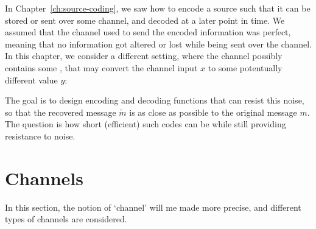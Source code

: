 In Chapter~\ref{ch:source-coding}, we saw how to encode a source such that it can be stored or sent over some channel, and decoded at a later point in time. We assumed that the channel used to send the encoded information was perfect, meaning that no information got altered or lost while being sent over the channel. In this chapter, we consider a different setting, where the channel possibly contains some , that may convert the channel input $x$ to some potentually different value $y$:

\begin{figure}[h]
\begin{center}
\end{center}
\end{figure}
The goal is to design encoding and decoding functions that can resist this noise, so that the recovered message $\tilde{m}$ is as close as possible to the original message $m$. The question is how short (efficient) such codes can be while still providing resistance to noise.

\section{Channels}\label{sec:noisy-channel}
In this section, the notion of `channel' will me made more precise, and different types of channels are considered.

